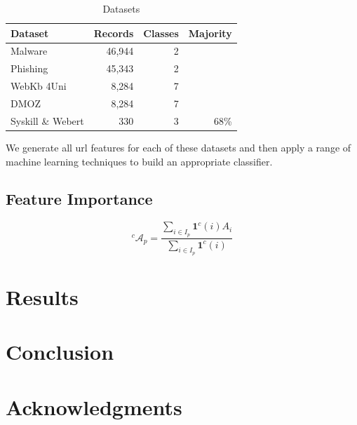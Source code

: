 \documentclass[sigconf]{acmart}
\begin{document}
\begin{table}
\caption{Datasets}
\label{tab:data}
\begin{tabular}{|l|r|r|r|}
\toprule
Dataset              &Records        &Classes  &Majority    \\
\midrule
Malware              &46,944          &2       &            \\
Phishing             &45,343          &2       &            \\
WebKb 4Uni           &8,284           &7       &            \\
DMOZ                 &8,284           &7       &            \\
Syskill \& Webert    &330             &3       &68\%        \\
\bottomrule
\end{tabular}
\end{table}

We generate all url features for each of these datasets and then apply a range of machine learning
techniques to build an appropriate classifier. 

\subsection{Feature Importance}

\begin{equation}
\label{campaign_baseline}
{}^c\mathcal{A}_p =  \frac{ \sum_{i \in I_p} \mathbf{1}^c(i) A_i }{ \sum_{i \in I_p} \mathbf{1}^c(i) }
\end{equation}


\section{Results}


\section{Conclusion}

\section{Acknowledgments}



\end{document}
